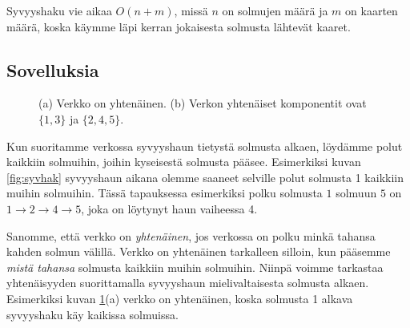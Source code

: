 Syvyyshaku vie aikaa $O(n+m)$, missä $n$ on solmujen määrä
ja $m$ on kaarten määrä,
koska käymme läpi kerran jokaisesta solmusta lähtevät kaaret.

\subsection{Sovelluksia}

\begin{figure}
\center
\begin{center}
\end{center}
\caption{(a) Verkko on yhtenäinen. (b) Verkon yhtenäiset komponentit ovat $\{1,3\}$ ja $\{2,4,5\}$.}
\label{fig:veryht}
\end{figure}

Kun suoritamme verkossa syvyyshaun tietystä solmusta alkaen,
löydämme polut kaikkiin solmuihin, joihin kyseisestä
solmusta pääsee.
Esimerkiksi kuvan \ref{fig:syvhak} syvyyshaun aikana
olemme saaneet selville polut solmusta 1 kaikkiin muihin solmuihin.
Tässä tapauksessa esimerkiksi polku solmusta $1$ solmuun $5$ on
$1 \rightarrow 2 \rightarrow 4 \rightarrow 5$,
joka on löytynyt haun vaiheessa 4.

Sanomme, että verkko on \emph{yhtenäinen},
jos verkossa on polku minkä tahansa kahden solmun välillä.
Verkko on yhtenäinen tarkalleen silloin,
kun pääsemme \emph{mistä tahansa} solmusta
kaikkiin muihin solmuihin.
Niinpä voimme tarkastaa yhtenäisyyden suorittamalla
syvyyshaun mielivaltaisesta solmusta alkaen.
Esimerkiksi kuvan \ref{fig:veryht}(a) verkko on yhtenäinen,
koska solmusta 1 alkava syvyyshaku käy kaikissa solmuissa.

